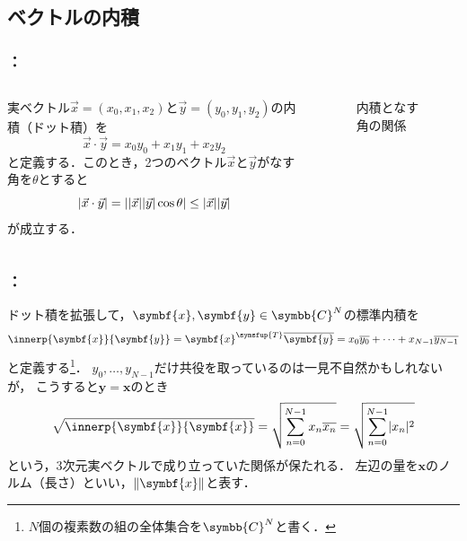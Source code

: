 \documentclass[unicode,11pt]{beamer}
\newcommand{\figurewidth}{5cm}
\newcommand{\termdef}[1]{\alert{\sffamily #1}}
\newcommand{\numset}[1]{\symbb{#1}}
\newcommand{\conj}[1]{\overline{#1}}
\DeclarePairedDelimiter{\abs}{\lvert}{\rvert}
\newcommand{\trps}[1]{#1^{\symsfup{T}}}
\newcommand{\vb}[1]{\symbf{#1}}
\DeclarePairedDelimiter{\norm}{\lVert}{\rVert}
\begin{document}
\subsection{ベクトルの内積}
\begin{frame}
  \frametitle{\secname ：\subsecname}
  \begin{columns}
    \begin{column}{0.6\textwidth}
      実ベクトル\(\vec{x}=(x_0,x_1,x_2)\)と\(\vec{y}=(y_0,y_1,y_2)\)の\termdef{内積}（ドット積）を
      \[
        \vec{x}\cdot\vec{y} = x_0y_0 + x_1y_1 + x_2y_2
      \]
      と定義する．このとき，2つのベクトル\(\vec{x}\)と\(\vec{y}\)がなす角を\(\theta\)とすると
      \[
        \abs{\vec{x}\cdot\vec{y}} = \abs{\lvert\vec{x}\rvert\lvert\vec{y}\rvert\cos\theta}
        \leq \lvert\vec{x}\rvert\lvert\vec{y}\rvert
      \]
      が成立する．
    \end{column}
    \begin{column}{0.4\textwidth}
      \begin{figure}
        \centering
        \caption{内積となす角の関係}
      \end{figure}
    \end{column}
  \end{columns}
\end{frame}

\begin{frame}
  \frametitle{\secname ：\subsecname}
  ドット積を拡張して，\(\vb{x},\vb{y}\in\numset{C}^N\)の\termdef{標準内積}を
  \[
    \innerp{\vb{x}}{\vb{y}} = \trps{\vb{x}}\conj{\vb{y}}
    = x_0\conj{y_0} + \dots + x_{N-1}\conj{y_{N-1}}
  \]
  と定義する\footnote{\(N\)個の複素数の組の全体集合を\(\numset{C}^N\)と書く．}．
  \(y_0,\dots,y_{N-1}\)だけ共役を取っているのは一見不自然かもしれないが，
  こうすると\(\vb{y}=\vb{x}\)のとき
  \[
    \sqrt{\innerp{\vb{x}}{\vb{x}}} = \sqrt{\sum_{n=0}^{N-1}x_n\conj{x_n}}
    = \sqrt{\sum_{n=0}^{N-1}\abs{x_n}^2}
  \]
  という，3次元実ベクトルで成り立っていた関係が保たれる．
  左辺の量を\(\vb{x}\)の\termdef{ノルム}（長さ）といい，\(\norm{\vb{x}}\)と表す．
\end{frame}
\end{document}
